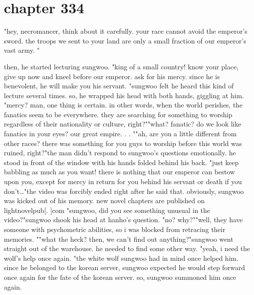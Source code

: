 \section{chapter 334}

"hey, necromancer, think about it carefully.
 your race cannot avoid the emperor's sword.
 the troops we sent to your land are only a small fraction of our emperor's vast army.
"




then, he started lecturing sungwoo.
"king of a small country! know your place, give up now and kneel before our emperor.
 ask for his mercy.
 since he is benevolent, he will make you his servant.
"sungwoo felt he heard this kind of lecture several times.
 so, he wrapped his head with both hands, giggling at him.
"mercy? man, one thing is certain.
 in other words, when the world perishes, the fanatics seem to be everywhere.
 they are searching for something to worship regardless of their nationality or culture, right?""what? fanatic? do we look like fanatics in your eyes? our great empire.
.
.
""ah, are you a little different from other races? there was something for you guys to worship before this world was ruined, right?"the man didn't respond to sungwoo's questions emotionally.
 he stood in front of the window with his hands folded behind his back.
 "just keep babbling as much as you want! there is nothing that our emperor can bestow upon you, except for mercy in return for you behind his servant or death if you don't…"the video was forcibly ended right after he said that.
 obviously, sungwoo was kicked out of his memory.
new novel chapters are published on lightnovelpub[.
]com "sungwoo, did you see something unusual in the video?"sungwoo shook his head at hanho's question.
"no? why?""well, they have someone with psychometric abilities, so i was blocked from retracing their memories.
""what the heck? then, we can't find out anything?"sungwoo went straight out of the warehouse.
 he needed to find some other way.
"yeah, i need the wolf's help once again.
"the white wolf sungwoo had in mind once helped him.
 since he belonged to the korean server, sungwoo expected he would step forward once again for the fate of the korean server.
so, sungwoo summoned him once again.

